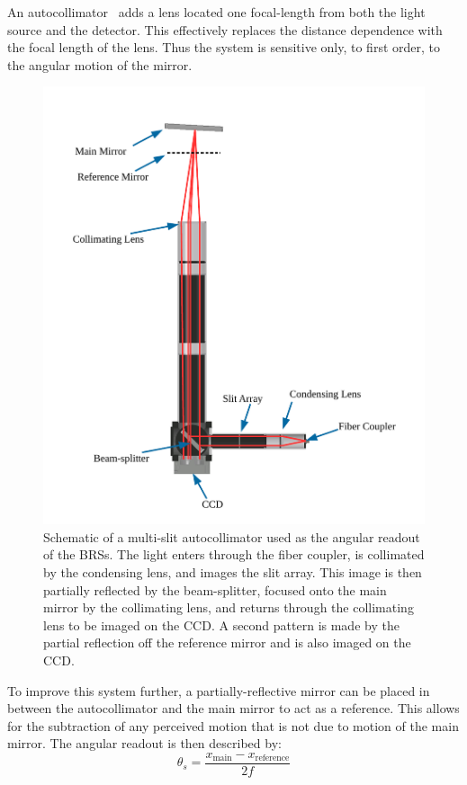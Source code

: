\documentclass [12pt, proquest]{uwthesis}[2019]
\begin{document}
An autocollimator~\cite{MSA} adds a lens located one focal-length from both the light source and the detector. This effectively replaces the distance dependence with the focal length of the lens. Thus the system is sensitive only, to first order, to the angular motion of the mirror.

\begin{figure}%
\begin{center}
 \includegraphics[width=\textwidth]{Autocollimator2.pdf}
\caption[Schematic of a multi-slit autocollimator]{Schematic of a multi-slit autocollimator used as the angular readout of the BRSs. The light enters through the fiber coupler, is collimated by the condensing lens, and images the slit array. This image is then partially reflected by the beam-splitter, focused onto the main mirror by the collimating lens, and returns through the collimating lens to be imaged on the CCD. A second pattern is made by the partial reflection off the reference mirror and is also imaged on the CCD.}
\label{ACFig}
\end{center}
\end{figure}

To improve this system further, a partially-reflective mirror can be placed in between the autocollimator and the main mirror to act as a reference. This allows for the subtraction of any perceived motion that is not due to motion of the main mirror. The angular readout is then described by:
\begin{equation}
\theta_{s}=\frac{x_{\text{main}}-x_{\text{reference}}}{2f}
\label{ACEq}
\end{equation}
\end{document}
